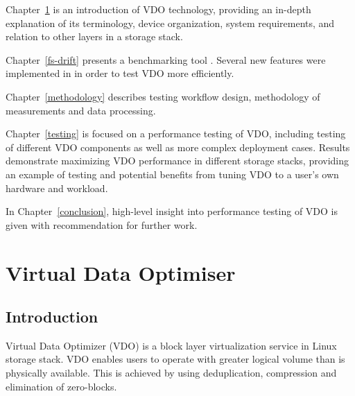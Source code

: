 \documentclass[
  color, %
  table, %
  lof,   %
  lot,   %
]{fithesis3}
\begin{document}
Chapter~\ref{VDO} is an introduction of VDO technology, providing an in-depth explanation of its terminology, device organization, system requirements, and relation to other layers in a storage stack.

Chapter~\ref{fs-drift} presents a benchmarking tool \fsdrift. Several new features were implemented in \fsdrift  in order to test VDO more efficiently.

Chapter~\ref{methodology} describes testing workflow design, methodology of measurements and data processing.

Chapter~\ref{testing} is focused on a performance testing of VDO, including testing of different VDO components as well as more complex deployment cases. Results demonstrate maximizing VDO performance in different storage stacks, providing an example of testing and potential benefits from tuning VDO to a user's own hardware and workload.

In Chapter~\ref{conclusion}, high-level insight into performance testing of VDO is given with recommendation for further work.

\chapter{Virtual Data Optimiser}
\label{VDO}
\section{Introduction}
Virtual Data Optimizer (VDO) is a block layer virtualization service in Linux storage stack. VDO enables users to operate with greater logical volume than is physically available. This is achieved by using deduplication, compression and elimination of zero-blocks.
\end{document}
